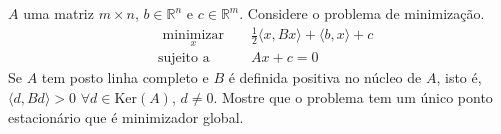 \documentclass[a4paper,latin]{article}
\begin{document}
\begin{enumerate}
    $A$ uma matriz $m \times n$, $b \in \mathbb{R}^n$ e 
    $c \in \mathbb{R}^m$.
    Considere o problema de minimização.  
    \begin{equation*}
    \begin{aligned}
    & \underset{x}{\text{ minimizar }}
    & & \frac{1}{2}\langle x, Bx \rangle+\langle b, x \rangle +c \\
    & \text{sujeito a }
    & & Ax+c=0
    \end{aligned}
    \end{equation*}
    Se $A$ tem posto linha completo e $B$ é definida positiva no núcleo de $A$, 
    isto é, 
    $\langle d, Bd \rangle >0$ 
    $\forall d \in \text{Ker}(A)$, 
    $d \neq 0$.
    Mostre que o problema tem um único ponto estacionário que é minimizador global.
 \end{enumerate}
\end{document}
